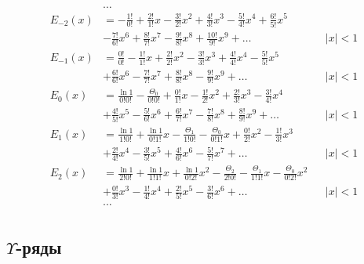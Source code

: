 \begin{equation*} \begin{aligned}
&\ldots \\
%
E_{-2}(x) &= 
- \frac{1!}{0!}
+ \frac{2!}{1!} x
- \frac{3!}{2!} x^2
+ \frac{4!}{3!} x^3
- \frac{5!}{4!} x^4
+ \frac{6!}{5!} x^5 \\ &
- \frac{7!}{6!} x^6
+ \frac{8!}{7!} x^7
- \frac{9!}{8!} x^8
+ \frac{10!}{9!} x^9
+ \ldots & 
&|x| < 1 \\
%
E_{-1}(x) &=  
  \frac{0!}{0!}
- \frac{1!}{1!} x
+ \frac{2!}{2!} x^2
- \frac{3!}{3!} x^3
+ \frac{4!}{4!} x^4
- \frac{5!}{5!} x^5 \\ &
+ \frac{6!}{6!} x^6
- \frac{7!}{7!} x^7
+ \frac{8!}{8!} x^8
- \frac{9!}{9!} x^9
+ \ldots & 
&|x| < 1 \\
%
E_0(x) &=
  \frac{\ln{1}}{0!0!}
- \frac{\Theta_0}{0!0!}
+ \frac{0!}{1!} x 
- \frac{1!}{2!} x^2
+ \frac{2!}{3!} x^3
- \frac{3!}{4!} x^4 \\ &
+ \frac{4!}{5!} x^5
- \frac{5!}{6!} x^6
+ \frac{6!}{7!} x^7
- \frac{7!}{8!} x^8
+ \frac{8!}{9!} x^9
+ \ldots & 
&|x| < 1 \\
%
E_1(x) &=
  \frac{\ln{1}}{1!0!} 
+ \frac{\ln{1}}{0!1!} x 
- \frac{\Theta_1}{1!0!}
- \frac{\Theta_0}{0!1!} x
+ \frac{0!}{2!} x^2
- \frac{1!}{3!} x^3 \\ &
+ \frac{2!}{4!} x^4
- \frac{3!}{5!} x^5
+ \frac{4!}{6!} x^6
- \frac{5!}{7!} x^7
+ \ldots & 
&|x| < 1 \\
%
E_2(x) &=
  \frac{\ln{1}}{2!0!}
+ \frac{\ln{1}}{1!1!} x
+ \frac{\ln{1}}{0!2!} x^2
- \frac{\Theta_2}{2!0!}
- \frac{\Theta_1}{1!1!} x
- \frac{\Theta_0}{0!2!} x^2 \\ &
+ \frac{0!}{3!} x^3
- \frac{1!}{4!} x^4
+ \frac{2!}{5!} x^5
- \frac{3!}{6!} x^6
+ \ldots & 
&|x| < 1 \\
%
&\ldots \\
\end{aligned} \end{equation*}

\subsection{$\Upsilon$-ряды}

